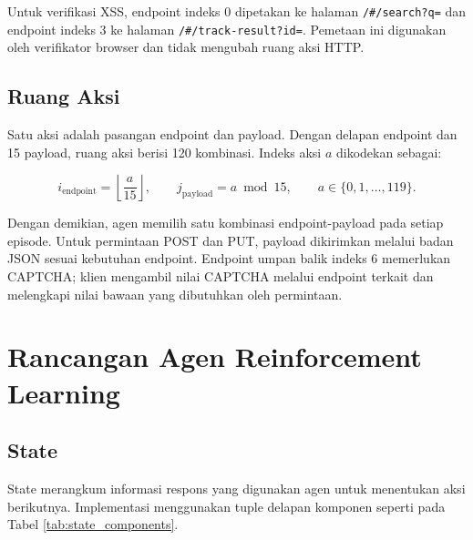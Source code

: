 Untuk verifikasi XSS, endpoint indeks 0 dipetakan ke halaman \texttt{/\#/search?q=} dan endpoint indeks 3 ke halaman \texttt{/\#/track-result?id=}. Pemetaan ini digunakan oleh verifikator browser dan tidak mengubah ruang aksi HTTP.

\subsection{Ruang Aksi}

Satu aksi adalah pasangan endpoint dan payload. Dengan delapan endpoint dan 15 payload, ruang aksi berisi 120 kombinasi. Indeks aksi \(a\) dikodekan sebagai:

\begin{equation}
i_{\text{endpoint}} = \left\lfloor \frac{a}{15} \right\rfloor,
\qquad
j_{\text{payload}} = a \bmod 15,
\qquad
a \in \{0,1,\ldots,119\}.
\label{eq:action_encoding}
\end{equation}

Dengan demikian, agen memilih satu kombinasi endpoint-payload pada setiap episode. Untuk permintaan POST dan PUT, payload dikirimkan melalui badan JSON sesuai kebutuhan endpoint. Endpoint umpan balik indeks 6 memerlukan CAPTCHA; klien mengambil nilai CAPTCHA melalui endpoint terkait dan melengkapi nilai bawaan yang dibutuhkan oleh permintaan.

\section{Rancangan Agen Reinforcement Learning}

\subsection{State}

State merangkum informasi respons yang digunakan agen untuk menentukan aksi berikutnya. Implementasi menggunakan tuple delapan komponen seperti pada Tabel \ref{tab:state_components}.

